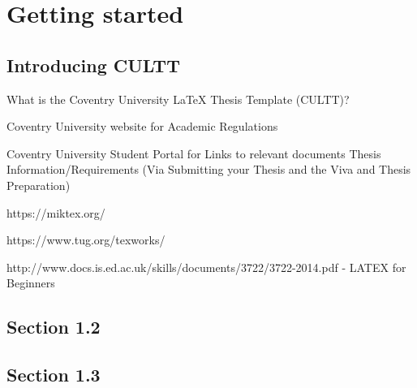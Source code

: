 
\chapter{Getting started}  %

\ifpdf
    \graphicspath{{Chapter1/Figs/Raster/}{Chapter1/Figs/PDF/}{Chapter1/Figs/}}
\else
    \graphicspath{{Chapter1/Figs/Vector/}{Chapter1/Figs/}}
\fi


\section{Introducing CULTT} %

What is the Coventry University \LaTeX{} Thesis Template (CULTT)?

Coventry University website for Academic Regulations

Coventry University Student Portal for Links to relevant documents Thesis Information/Requirements (Via Submitting your Thesis and the Viva and Thesis Preparation)

https://miktex.org/

https://www.tug.org/texworks/

http://www.docs.is.ed.ac.uk/skills/documents/3722/3722-2014.pdf - LATEX for Beginners

\section{Section 1.2} %



\section{Section 1.3}  %
\label{section1.3}

